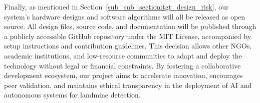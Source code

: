 Finally, as mentioned in Section~\ref{sub_sub_section:tgt_design_risk}, our system’s hardware designs and software algorithms will all be released as open source. All design files, source code, and documentation will be published through a publicly accessible GitHub repository under the MIT License, accompanied by setup instructions and contribution guidelines. This decision allows other \gls{NGOs}, academic institutions, and low-resource communities to adapt and deploy the technology without legal or financial constraints. By fostering a collaborative development ecosystem, our project aims to accelerate innovation, encourages peer validation, and maintains ethical transparency in the deployment of AI and autonomous systems for landmine detection.
